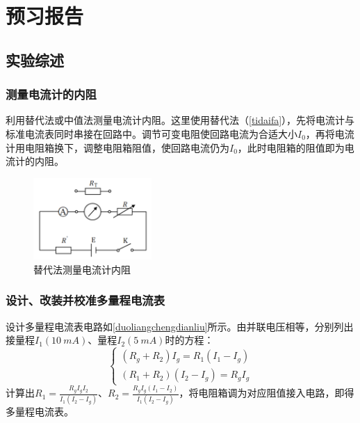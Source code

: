 \documentclass{../template/Preport}
\begin{document}
\setcounter{page}{0}
\makecover

\section{预习报告}
\subsection{实验综述}
\subsubsection{测量电流计的内阻}
    利用替代法或中值法测量电流计内阻。这里使用替代法（\autoref{tidaifa}），先将电流计与标准电流表同时串接在回路中。调节可变电阻使回路电流为合适大小$I_0$，再将电流计用电阻箱换下，调整电阻箱阻值，使回路电流仍为$I_0$，此时电阻箱的阻值即为电流计的内阻。
    \begin{figure}[htbp]
        \centering
        \includegraphics[width=0.4\textwidth]{figures/tidaifa.png}
        \caption{替代法测量电流计内阻}
        \label{tidaifa}
    \end{figure}

\subsubsection{设计、改装并校准多量程电流表}
    设计多量程电流表电路如\autoref{duoliangchengdianliu}所示。由并联电压相等，分别列出接量程$I_1(\SI{10}{mA})$、量程$I_2(\SI{5}{mA})$时的方程：
    \begin{equation}
        \begin{cases}
            (R_g+R_2)I_g = R_1 (I_1 - I_g)\\
            (R_1+R_2)(I_2 - I_g) = R_g I_g
        \end{cases}
    \end{equation}
    计算出$R_1 = \frac{R_gI_gI_2}{I_1(I_2-I_g)}$、$R_2 = \frac{R_gI_g(I_1-I_2)}{I_1(I_2-I_g)}$，将电阻箱调为对应阻值接入电路，即得多量程电流表。
\end{document}
